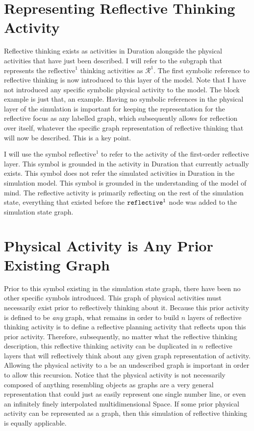 \section{Representing Reflective Thinking Activity}

Reflective thinking exists as activities in Duration alongside the
physical activities that have just been described.  I will refer to
the subgraph that represents the $\text{reflective}^1$ thinking
activities as $\mathcal{R}^1$.  The first symbolic reference to
reflective thinking is now introduced to this layer of the model.
Note that I have not introduced any specific symbolic physical
activity to the model.  The block example is just that, an example.
Having no symbolic references in the physical layer of the simulation
is important for keeping the representation for the reflective focus
as any labelled graph, which subsequently allows for reflection over
itself, whatever the specific graph representation of reflective
thinking that will now be described.  This is a key point.

I will use the symbol {\tt $\text{reflective}^1$} to refer to the
activity of the first-order reflective layer.  This symbol is grounded
in the activity in Duration that currently actually exists.  This
symbol does not refer the simulated activities in Duration in the
simulation model.  This symbol is grounded in the understanding of the
model of mind.  The reflective activity is primarily reflecting on the
rest of the simulation state, everything that existed before the
$\text{\tt{reflective}}^1$ node was added to the simulation state
graph.

\section{Physical Activity is Any Prior Existing Graph}

Prior to this symbol existing in the simulation state graph, there
have been no other specific symbols introduced.  This graph of
physical activities must necessarily exist prior to reflectively
thinking about it.  Because this prior activity is defined to be
\emph{any} graph, what remains in order to build $n$ layers of
reflective thinking activity is to define a reflective planning
activity that reflects upon this prior activity.  Therefore,
subsequently, no matter what the reflective thinking description, this
reflective thinking activity can be duplicated in $n$ reflective
layers that will reflectively think about any given graph
representation of activity.  Allowing the physical activity to a be an
undescribed graph is important in order to allow this recursion.
Notice that the physical activity is not necessarily composed of
anything resembling objects as graphs are a very general
representation that could just as easily represent one single number
line, or even an infinitely finely interpolated multidimensional
Space.  If some prior physical activity can be represented as a graph,
then this simulation of reflective thinking is equally applicable.

